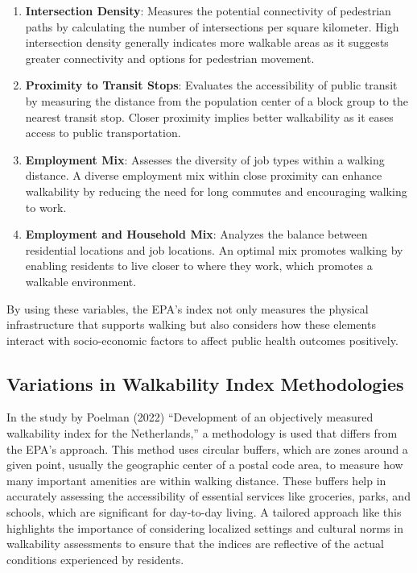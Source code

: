 \documentclass[
]{article}
\begin{document}
\begin{enumerate}
\def\labelenumi{\arabic{enumi}.}
\item
  \textbf{Intersection Density}: Measures the potential connectivity of
  pedestrian paths by calculating the number of intersections per square
  kilometer. High intersection density generally indicates more walkable
  areas as it suggests greater connectivity and options for pedestrian
  movement.
\item
  \textbf{Proximity to Transit Stops}: Evaluates the accessibility of
  public transit by measuring the distance from the population center of
  a block group to the nearest transit stop. Closer proximity implies
  better walkability as it eases access to public transportation.
\item
  \textbf{Employment Mix}: Assesses the diversity of job types within a
  walking distance. A diverse employment mix within close proximity can
  enhance walkability by reducing the need for long commutes and
  encouraging walking to work.
\item
  \textbf{Employment and Household Mix}: Analyzes the balance between
  residential locations and job locations. An optimal mix promotes
  walking by enabling residents to live closer to where they work, which
  promotes a walkable environment.
\end{enumerate}

By using these variables, the EPA's index not only measures the physical
infrastructure that supports walking but also considers how these
elements interact with socio-economic factors to affect public health
outcomes positively.

\subsection{Variations in Walkability Index
Methodologies}\label{variations-in-walkability-index-methodologies}

In the study by Poelman (2022) ``Development of an objectively measured
walkability index for the Netherlands,'' a methodology is used that
differs from the EPA's approach. This method uses circular buffers,
which are zones around a given point, usually the geographic center of a
postal code area, to measure how many important amenities are within
walking distance. These buffers help in accurately assessing the
accessibility of essential services like groceries, parks, and schools,
which are significant for day-to-day living. A tailored approach like
this highlights the importance of considering localized settings and
cultural norms in walkability assessments to ensure that the indices are
reflective of the actual conditions experienced by residents.
\end{document}
